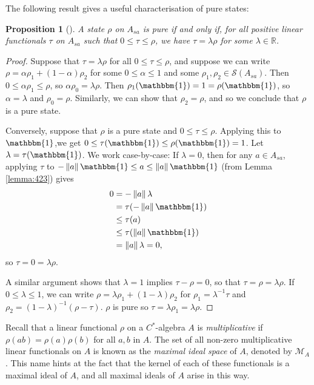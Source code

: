 \documentclass[11pt,a4paper]{report}
\theoremstyle{plain}
\newtheorem{prop}{Proposition}
\theoremstyle{definition}
\newcommand{\1}{\mathbbm{1}}
\newcommand{\R}{\mathbb{R}}
\newcommand{\M}{\mathcal{M}}
\renewcommand{\S}{\mathscr{S}}
\begin{document}
The following result gives a useful characterisation of pure states:
\begin{prop}[{\cite[3.4.6]{kadison83}}]\label{prop:pure2}
	A state $\rho$ on $A_{sa}$ is pure if and only if, for all positive linear 
	functionals $\tau$ on $A_{sa}$ such that $0\leq\tau\leq\rho$, we have $\tau 
	=\lambda\rho$ for some $\lambda\in\R$. 

\end{prop}
\begin{proof}
	Suppose that $\tau =\lambda\rho$ for all $0\leq\tau\leq\rho$, and suppose we can 
	write $\rho=\alpha\rho_1+(1-\alpha)\rho_2$ for some $0\leq\alpha\leq1$ and some 
	$\rho_1,\rho_2 \in\S(A_{sa})$. Then $0\leq\alpha\rho_1\leq\rho$, so 
	$\alpha\rho_0 = \lambda\rho$. Then $\rho_1(\1)=1=\rho(\1)$, so $\alpha = 
	\lambda$ and $\rho_0 =\rho$. Similarly, we can show that $\rho_2=\rho$, and so 
	we conclude that $\rho$ is a pure state.

	
	Conversely, suppose that $\rho$ is a pure state and $0\leq\tau\leq\rho$. 
	Applying this to $\1$,we get $0\leq\tau(\1)\leq\rho(\1) = 1$. Let $\lambda = 
	\tau(\1)$. We work case-by-case: If $\lambda=0$, then for any $a\in A_{sa}$, 
	applying $\tau$ to $-\left\|a\right\|\1 \leq a \leq\left\|a\right\|\1$ (from 
	Lemma \ref{lemma:423}) gives
	\begin{align*}
		0&=		-\left\|a\right\|\lambda 													\\
		&= 		\tau(-\left\|a\right\|\1) 													\\
		&\leq 	\tau(a) 																	\\
		&\leq 	\tau(\left\|a\right\|\1) 													\\
		&= 		\left\|a\right\| \lambda = 0,
	\end{align*}
	so $\tau=0=\lambda\rho$.
	
	A similar argument shows that $\lambda=1$ implies $\tau-\rho=0$, so that 
	$\tau=\rho=\lambda\rho$. If $0\leq\lambda\leq 1$, we can write 
	$\rho=\lambda\rho_1+(1-\lambda)\rho_2$ for $\rho_1=\lambda^{-1}\tau$ and 
	$\rho_2=(1-\lambda)^{-1}(\rho-\tau)$. $\rho$ is pure so 
	$\tau=\lambda\rho_1=\lambda\rho$.

	
\end{proof}
Recall that a linear functional $\rho$ on a $C^\ast$-algebra $A$ is 
\emph{multiplicative} if $\rho(ab)=\rho(a)\rho(b)$ for all $a,b$ in $A$. The set 
of all non-zero multiplicative linear functionals on $A$ is known as the 
\emph{maximal ideal space} of $A$, denoted by $\M_A$. This name hints at the fact 
that the kernel of each of these functionals is a maximal ideal of $A$, and all 
maximal ideals of $A$ arise in this way. \cite[Theorem I.2.5]{davidson96}
\end{document}
